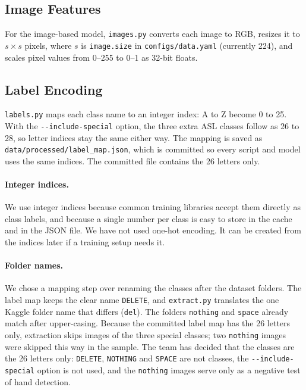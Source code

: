 \subsection{Image Features}

For the image-based model, \texttt{images.py} converts each image to RGB, resizes it to $s \times s$ pixels, where $s$ is \texttt{image.size} in \texttt{configs/data.yaml} (currently 224), and scales pixel values from 0--255 to 0--1 as 32-bit floats.

\subsection{Label Encoding}

\texttt{labels.py} maps each class name to an integer index: A to Z become 0 to 25. With the \texttt{-{}-include-special} option, the three extra ASL classes follow as 26 to 28, so letter indices stay the same either way. The mapping is saved as \texttt{data/processed/label\_map.json}, which is committed so every script and model uses the same indices. The committed file contains the 26 letters only.

\paragraph{Integer indices.} We use integer indices because common training libraries accept them directly as class labels, and because a single number per class is easy to store in the cache and in the JSON file. We have not used one-hot encoding. It can be created from the indices later if a training setup needs it.

\paragraph{Folder names.} We chose a mapping step over renaming the classes after the dataset folders. The label map keeps the clear name \texttt{DELETE}, and \texttt{extract.py} translates the one Kaggle folder name that differs (\texttt{del}). The folders \texttt{nothing} and \texttt{space} already match after upper-casing. Because the committed label map has the 26 letters only, extraction skips images of the three special classes; two \texttt{nothing} images were skipped this way in the sample. The team has decided that the classes are the 26 letters only: \texttt{DELETE}, \texttt{NOTHING} and \texttt{SPACE} are not classes, the \texttt{-{}-include-special} option is not used, and the \texttt{nothing} images serve only as a negative test of hand detection.

